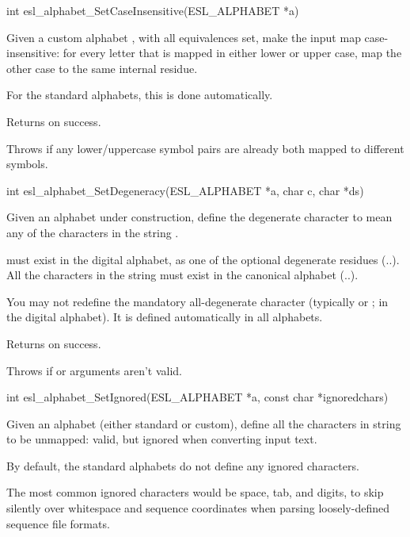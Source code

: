 \begin{sreapi}
\hypertarget{func:esl_alphabet_SetCaseInsensitive()}
{\item[int esl\_alphabet\_SetCaseInsensitive(ESL\_ALPHABET *a)]}

Given a custom alphabet , with all equivalences set,
make the input map case-insensitive: for every
letter that is mapped in either lower or upper
case, map the other case to the same internal
residue.

For the standard alphabets, this is done automatically.

Returns  on success.                

Throws  if any lower/uppercase symbol pairs
are already both mapped to different symbols.


\hypertarget{func:esl_alphabet_SetDegeneracy()}
{\item[int esl\_alphabet\_SetDegeneracy(ESL\_ALPHABET *a, char c, char *ds)]}

Given an alphabet under construction, 
define the degenerate character  to mean
any of the characters in the string .

 must exist in the digital alphabet, as
one of the optional degenerate residues (..).
All the characters in the  string must exist
in the canonical alphabet (..).

You may not redefine the mandatory all-degenerate character
(typically  or ;  in the digital alphabet).
It is defined automatically in all alphabets. 

Returns  on success.

Throws  if  or  arguments aren't valid.


\hypertarget{func:esl_alphabet_SetIgnored()}
{\item[int esl\_alphabet\_SetIgnored(ESL\_ALPHABET *a, const char *ignoredchars)]}

Given an alphabet  (either standard or custom), define
all the characters in string  to be
unmapped: valid, but ignored when converting input text.

By default, the standard alphabets do not define any
ignored characters.

The most common ignored characters would be space, tab,
and digits, to skip silently over whitespace and
sequence coordinates when parsing loosely-defined
sequence file formats.


\end{sreapi}

